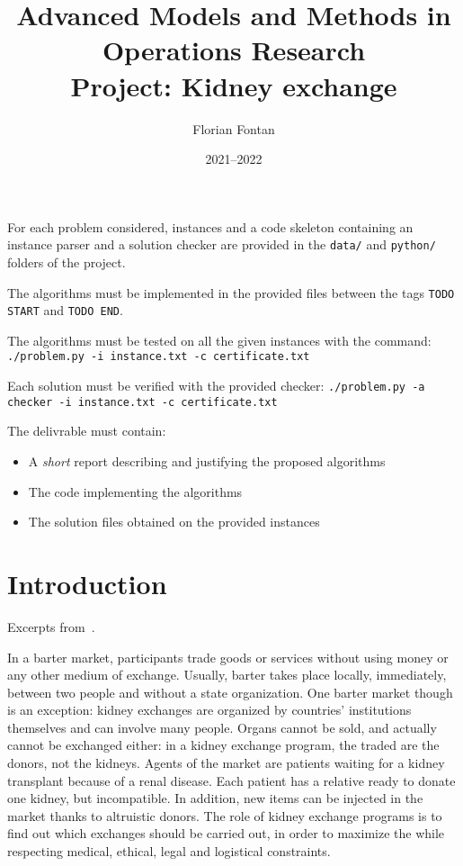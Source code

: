 \documentclass[a4paper]{article}
\author{Florian Fontan}
\title{Advanced Models and Methods in Operations Research \\ Project: Kidney exchange}
\date{2021--2022}
\begin{document}
\maketitle

For each problem considered, instances and a code skeleton containing an instance parser and a solution checker are provided in the \texttt{data/} and \texttt{python/} folders of the project.

The algorithms must be implemented in the provided files between the tags \texttt{TODO START} and \texttt{TODO END}.

The algorithms must be tested on all the given instances with the command: \texttt{./problem.py -i instance.txt -c certificate.txt}

Each solution must be verified with the provided checker: \texttt{./problem.py -a checker -i instance.txt -c certificate.txt}

\bigskip

The delivrable must contain:
\begin{itemize}
  \item A \emph{short} report describing and justifying the proposed algorithms
  \item The code implementing the algorithms
  \item The solution files obtained on the provided instances
\end{itemize}

\section*{Introduction}

Excerpts from~\cite{pansart_algorithms_2020}.

In a barter market, participants trade goods or services without using money or any other medium of exchange. Usually, barter takes place locally, immediately, between two people and without a state organization. One barter market though is an exception: kidney exchanges are organized by countries’ institutions themselves and can involve many people. Organs
cannot be sold, and actually cannot be exchanged either: in a kidney exchange program, the traded  are the donors, not the kidneys. Agents of the market are patients waiting for a kidney transplant because of a renal disease. Each patient has a relative ready to donate one kidney, but incompatible. In addition, new items can be injected in the market thanks
to altruistic donors. The role of kidney exchange programs is to find out which exchanges should be carried out, in order to maximize the  while respecting medical, ethical, legal and logistical constraints.
\end{document}

